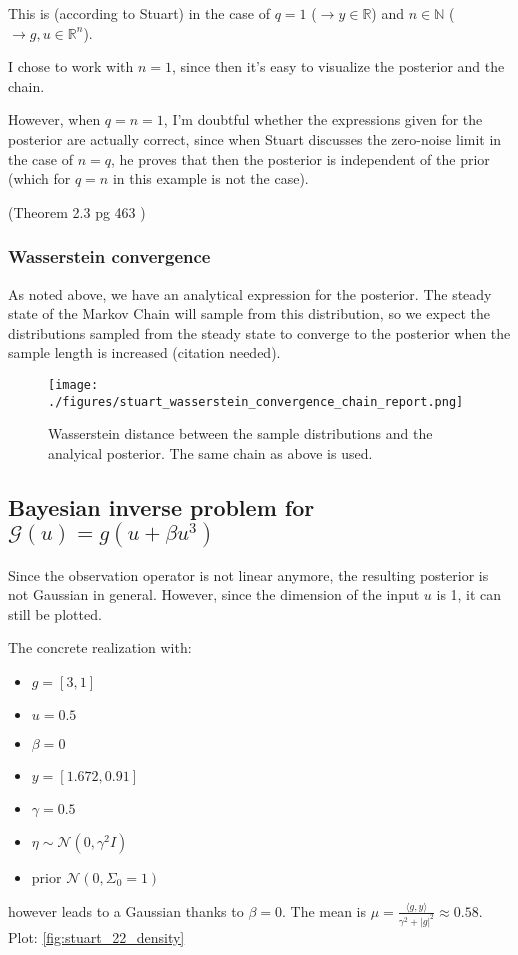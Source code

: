 \documentclass[11pt]{article}
\newcommand{\R}{{\mathbb{R}}}
\newcommand{\NN}{{\mathbb{N}}}
\newcommand{\G}[1]{{\mathcal{G} \left( #1 \right)}}
\newcommand{\N}[2]{\mathcal{N}\left(#1,#2\right)}
\begin{document}
This is (according to Stuart) in the case of \(q = 1\) (\(\to y \in \R\)) and \(n \in \NN\) (\(\to g,u \in \R^n\)).

I chose to work with \(n=1\), since then it's easy to visualize the posterior and the chain.

However, when \(q=n=1\), I'm doubtful whether the expressions given for the posterior are actually
correct, since when Stuart discusses the zero-noise limit in the case of \(n=q\), he proves that
then the posterior is independent of the prior (which for \(q=n\) in this example is not the case).

(Theorem 2.3 pg 463 \cite{stuart_inverse_2010})

\subsubsection{Wasserstein convergence}
\label{sec:org1038c2b}

As noted above, we have an analytical expression for the posterior. The steady state of the
Markov Chain will sample from this distribution, so we expect the distributions sampled
from the steady state to converge to the posterior 
when the sample length is increased (citation needed).

\begin{figure}[htbp]
\centering
\texttt{[image: ./figures/stuart\_wasserstein\_convergence\_chain\_report.png]}
\caption{\label{fig:stuart_21_convergence}
Wasserstein distance between the sample distributions and the analyical posterior. The same chain as above is used.}
\end{figure}

\subsection{Bayesian inverse problem for \(\G{u} = g (u + \beta u^3)\)}
\label{sec:orgb249dd9}
Since the observation operator is not linear anymore, the resulting posterior is not
Gaussian in general. However, since the dimension of the input \(u\) is 1, it can
still be plotted.

The concrete realization with:
\begin{itemize}
\item \(g = [3, 1]\)
\item \(u = 0.5\)
\item \(\beta = 0\)
\item \(y= [1.672, 0.91]\)
\item \(\gamma = 0.5\)
\item \(\eta \sim \N{0}{\gamma^2 I}\)
\item prior \(\N{0}{\Sigma_0=1}\)
\end{itemize}
however leads to a Gaussian thanks to \(\beta = 0\). The mean is
\(\mu = \frac{\langle g,y \rangle}{\gamma^2 + |g|^2} \approx 0.58\). Plot: \ref{fig:stuart_22_density}
\end{document}
